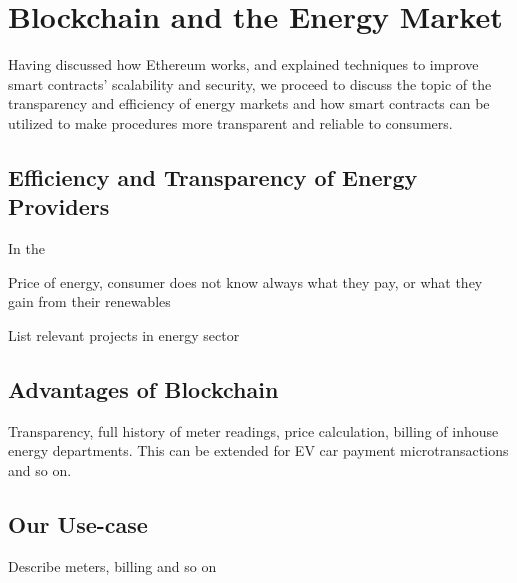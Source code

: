 \chapter{Blockchain and the Energy Market}

Having discussed how Ethereum works, and explained techniques to improve smart contracts' scalability and security, we proceed to discuss the topic of the transparency and efficiency of energy markets and how smart contracts can be utilized to make procedures more transparent and reliable to consumers.

\section{Efficiency and Transparency of Energy Providers}

In the 

Price of energy, consumer does not know always what they pay, or what they gain from their renewables

List relevant projects in energy sector


\section{Advantages of Blockchain}
Transparency, full history of meter readings, price calculation, billing of inhouse energy departments. This can be extended for EV car payment microtransactions and so on.


\section{Our Use-case}
Describe meters, billing and so on
